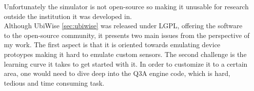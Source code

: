 Unfortunately the simulator is not open-source so making it unusable for research outside the institution it was developed in.\\

Although UbiWise \ref{sec:ubiwise} was released under LGPL\cite{lgpl}, offering the software to the open-source community, it presents two main issues from the perspective of my work. The first aspect is that it is oriented towards emulating device protoypes making it hard to emulate custom sensors. The second challenge is the learning curve it takes to get started with it. In order to customize it to a certain area, one would need to dive deep into the Q3A engine code, which is hard, tedious and time consuming task.\\
